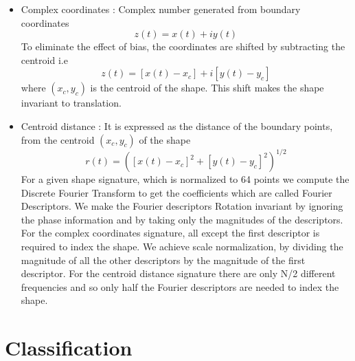 \documentclass{acm} %
\begin{document}
\begin{itemize}
\item Complex coordinates : Complex number generated from boundary coordinates $$z(t) = x(t) + iy(t)$$ To eliminate the effect of bias, the coordinates are shifted by subtracting the centroid i.e $$z(t) = [x(t) - x_c] + i[y(t) - y_c]$$ where $(x_c,y_c)$ is the centroid of the shape. This shift makes the shape invariant to translation.
\item Centroid distance : It is expressed as the distance of the boundary points, from the centroid $(x_c, y_c)$ of the shape $$r(t) = ([x(t) - x_c]^{2} + [y(t) - y_c]^{2})^{1/2}$$
For a given shape signature, which is normalized to 64 points we compute the Discrete Fourier Transform to get the coefficients which are called Fourier Descriptors. We make the Fourier descriptors Rotation invariant by ignoring the phase information and by taking only the magnitudes of the descriptors. For the complex coordinates signature, all except the first descriptor is required to index the shape. 
\hfill \break
\hfill \break
We achieve scale normalization, by dividing the magnitude of all the other descriptors by the magnitude of the first descriptor. For the centroid distance signature there are only N/2 different frequencies and so only half the Fourier descriptors are needed to index the shape.

\end{itemize}

\section{Classification}
\end{document}
